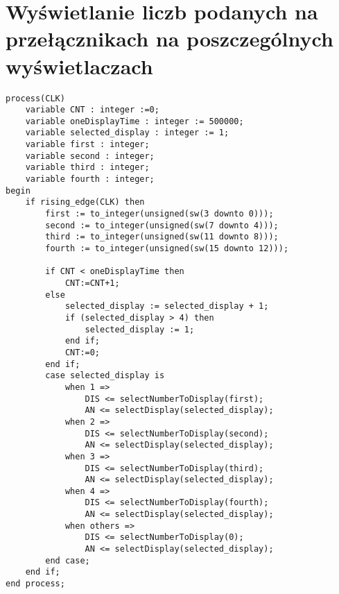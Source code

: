 \documentclass[a4paper, 12pt, titlepage]{article}
\begin{document}
	\section{Wyświetlanie liczb podanych na przełącznikach na poszczególnych wyświetlaczach}
\begin{lstlisting}[frame=single,keepspaces=true]
process(CLK)
	variable CNT : integer :=0;
	variable oneDisplayTime : integer := 500000;
	variable selected_display : integer := 1;
	variable first : integer;
	variable second : integer;
	variable third : integer;
	variable fourth : integer;
begin 	 
	if rising_edge(CLK) then
		first := to_integer(unsigned(sw(3 downto 0)));
		second := to_integer(unsigned(sw(7 downto 4)));
		third := to_integer(unsigned(sw(11 downto 8)));
		fourth := to_integer(unsigned(sw(15 downto 12)));
		
		if CNT < oneDisplayTime then
			CNT:=CNT+1;
		else
			selected_display := selected_display + 1;
			if (selected_display > 4) then
				selected_display := 1;
			end if;	
			CNT:=0;
		end if;
		case selected_display is
			when 1 =>
				DIS <= selectNumberToDisplay(first);
				AN <= selectDisplay(selected_display);
			when 2 =>
				DIS <= selectNumberToDisplay(second);
				AN <= selectDisplay(selected_display);
			when 3 =>
				DIS <= selectNumberToDisplay(third);
				AN <= selectDisplay(selected_display);
			when 4 =>
				DIS <= selectNumberToDisplay(fourth);
				AN <= selectDisplay(selected_display);
			when others =>
				DIS <= selectNumberToDisplay(0);
				AN <= selectDisplay(selected_display);
		end case;
	end if;
end process;   
\end{lstlisting}
\end{document}
